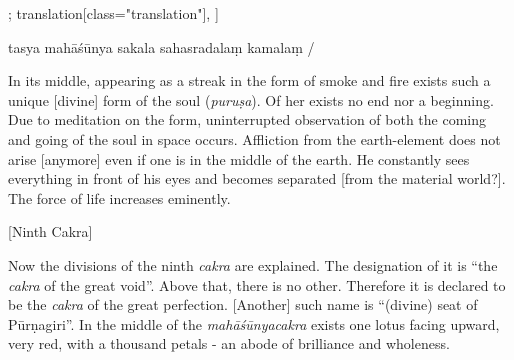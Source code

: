 \begin{alignment}[
  texts=edition[class="edition"];
  translation[class="translation"],
  ]
\begin{edition}
\begin{prose}
tasya mahāśūnya
sakala
sahasradalaṃ
kamalaṃ
/
\end{prose}
  \end{edition}
  \begin{translation}
    \begin{tlate}
      In its middle, appearing as a streak in the form of smoke and fire exists such a unique [divine] form of the soul (\textit{puruṣa}). Of her exists no end nor a beginning. Due to meditation on the form, uninterrupted observation of both the coming and going of the soul in space occurs. Affliction from the earth-element does not arise [anymore] even if one is in the middle of the earth. He constantly sees everything in front of his eyes and becomes separated [from the material world?]. The force of life increases eminently. 
      \end{tlate}
    \bigskip
    \centerline{\textrm{\small{[Ninth Cakra]}}}
    \bigskip
    \begin{tlate}
      Now the divisions of the ninth \textit{cakra} are explained. The designation of it is ``the \textit{cakra} of the great void''. Above that, there is no other. Therefore it is declared to be the \textit{cakra} of the great perfection. [Another] such name is ``(divine) seat of Pūrṇagiri''. In the middle of the \textit{mahāśūnyacakra} exists one lotus facing upward, very red, with a thousand petals - an abode of brilliance and wholeness.
      \vspace*{\fill} 
    \end{tlate}
  \end{translation}
     \ekdpb*{}
\end{alignment}
